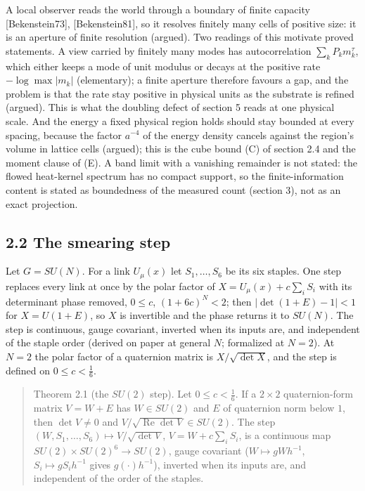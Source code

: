 \documentclass[10pt,letterpaper,twocolumn]{article}
\begin{document}
A local observer reads the world through a boundary of finite capacity {[}Bekenstein73{]}, {[}Bekenstein81{]}, so it resolves finitely many cells of positive size: it is an aperture of finite resolution (argued). Two readings of this motivate proved statements. A view carried by finitely many modes has autocorrelation \(\sum_kP_km_k^\tau\), which either keeps a mode of unit modulus or decays at the positive rate \(-\log\max|m_k|\) (elementary); a finite aperture therefore favours a gap, and the problem is that the rate stay positive in physical units as the substrate is refined (argued). This is what the doubling defect of section 5 reads at one physical scale. And the energy a fixed physical region holds should stay bounded at every spacing, because the factor \(a^{-4}\) of the energy density cancels against the region's volume in lattice cells (argued); this is the cube bound (C) of section 2.4 and the moment clause of (E). A band limit with a vanishing remainder is not stated: the flowed heat-kernel spectrum has no compact support, so the finite-information content is stated as boundedness of the measured count (section 3), not as an exact projection.

\subsection{2.2 The smearing step}\label{22-the-smearing-step}

Let \(G=SU(N)\). For a link \(U_\mu(x)\) let \(S_1,\dots,S_6\) be its six staples. One step replaces every link at once by the polar factor of \(X=U_\mu(x)+c\sum_iS_i\) with its determinant phase removed, \(0\le c\), \((1+6c)^N<2\); then \(|\det(1+E)-1|<1\) for \(X=U(1+E)\), so \(X\) is invertible and the phase returns it to \(SU(N)\). The step is continuous, gauge covariant, inverted when its inputs are, and independent of the staple order (derived on paper at general \(N\); formalized at \(N=2\)). At \(N=2\) the polar factor of a quaternion matrix is \(X/\sqrt{\det X}\), and the step is defined on \(0\le c<\tfrac16\).

\begin{quote}
Theorem 2.1 (the \(SU(2)\) step). Let \(0\le c<\tfrac16\). If a \(2\times2\) quaternion-form matrix \(V=W+E\) has \(W\in SU(2)\) and \(E\) of quaternion norm below \(1\), then \(\det V\ne0\) and \(V/\sqrt{\operatorname{Re}\det V}\in SU(2)\). The step \((W,S_1,\dots,S_6)\mapsto V/\sqrt{\det V}\), \(V=W+c\sum_iS_i\), is a continuous map \(SU(2)\times SU(2)^6\to SU(2)\), gauge covariant (\(W\mapsto gWh^{-1}\), \(S_i\mapsto gS_ih^{-1}\) gives \(g(\cdot)h^{-1}\)), inverted when its inputs are, and independent of the order of the staples.
\end{quote}
\end{document}
